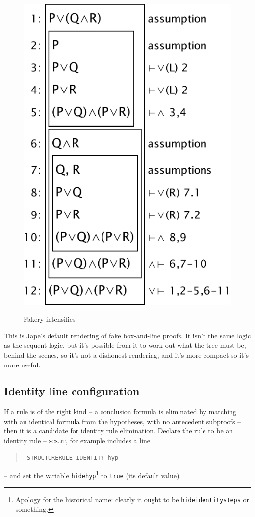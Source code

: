 \documentclass[11pt]{article}
\newcommand{\picscale}{0.6}
\newenvironment{japeish}{\begin{quote}\tt\small}{\end{quote}}
\newcommand{\textj}[1]{{\tt\small{#1}}}
\begin{document}
\begin{figure}
{\includegraphics[scale=\picscale]{pics/secondtreeboxedidhidden}
\label{fig:secondtreeboxedidhidden}}
\caption{Fakery intensifies}
\label{fig:secondtreeboxedall}
\end{figure}

This is Jape's default rendering of fake box-and-line proofs. It isn't the same logic as the sequent logic, but it's possible from it to work out what the tree must be, behind the scenes, so it's not a dishonest rendering, and it's more compact so it's more useful.

\subsection{Identity line configuration}

If a rule is of the right kind -- a conclusion formula is eliminated by matching with an identical formula from the hypotheses, with no antecedent subproofs -- then it is a candidate for identity rule elimination. Declare the rule to be an identity rule -- \textsc{scs.jt}, for example includes a line
\begin{japeish}
STRUCTURERULE IDENTITY hyp
\end{japeish}
-- and set the variable \textj{hidehyp}\footnote{Apology for the historical name: clearly it ought to be \textj{hideidentitysteps} or something.} to \textj{true} (its default value).
\end{document}
